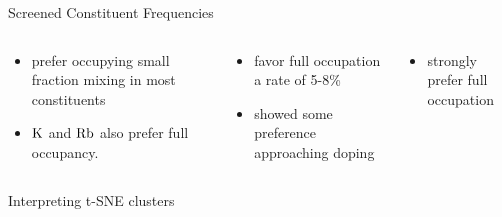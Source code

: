 \documentclass[10pt, aspectratio=169, presentation]{beamer}
\begin{document}
\begin{frame}[label={sec:orgc050f95}]{Screened Constituent Frequencies}
 
\begin{center}

\end{center}

\begin{columns}
\begin{column}{0.3\columnwidth}
\begin{itemize}
\item prefer occupying small fraction mixing in most constituents
\item \(\ce{K}\) and \(\ce{Rb}\) also prefer full occupancy.
\end{itemize}
\end{column}

\begin{column}{0.3\columnwidth}
\begin{itemize}
\item favor full occupation a rate of 5-8\%
\item showed some preference approaching doping
\end{itemize}
\end{column}

\begin{column}{0.3\columnwidth}
\begin{itemize}
\item strongly prefer full occupation
\end{itemize}
\end{column}
\end{columns}
\end{frame}

\begin{frame}[label={sec:orgb88ffa3}]{Interpreting t-SNE clusters}
\begin{columns}
\begin{column}{0.5\columnwidth}
 
\begin{center}

\end{center}
\end{column}

\begin{column}{0.5\columnwidth}
 
\begin{center}

\end{center}
\end{column}
\end{columns}
\end{frame}
\end{document}
